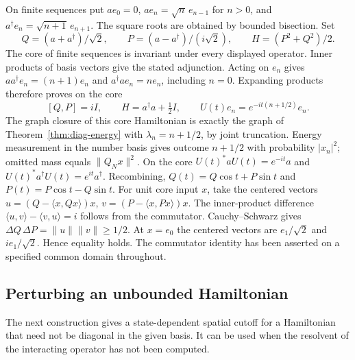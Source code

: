 On finite sequences put $ae_0=0$,
$ae_n=\sqrt n\,e_{n-1}$ for $n>0$, and
$a^\dagger e_n=\sqrt{n+1}\,e_{n+1}$. The square roots are obtained
by bounded bisection. Set
\[
 Q=(a+a^\dagger)/\sqrt2,\qquad
 P=(a-a^\dagger)/(i\sqrt2),\qquad
 H=(P^2+Q^2)/2 .
\]
The core of finite sequences is invariant under every displayed
operator. Inner products of basis vectors give the stated adjunction.
Acting on $e_n$ gives $aa^\dagger e_n=(n+1)e_n$ and
$a^\dagger a e_n=ne_n$, including $n=0$. Expanding products therefore
proves on the core
\[
 [Q,P]=iI,\qquad H=a^\dagger a+\tfrac12 I,\qquad
 U(t)e_n=e^{-it(n+1/2)}e_n .
\]
The graph closure of this core Hamiltonian is exactly the graph of
Theorem~\ref{thm:diag-energy} with $\lambda_n=n+1/2$, by joint
truncation. Energy measurement in the number basis gives outcome $n+1/2$
with probability $|x_n|^2$; omitted mass equals $\|Q_Nx\|^2$.
On the core $U(t)^*aU(t)=e^{-it}a$ and
$U(t)^*a^\dagger U(t)=e^{it}a^\dagger$. Recombining,
$Q(t)=Q\cos t+P\sin t$ and $P(t)=P\cos t-Q\sin t$.
For unit core input $x$, take the centered vectors
$u=(Q-\langle x,Qx\rangle)x$, $v=(P-\langle x,Px\rangle)x$.
The inner-product difference
$\langle u,v\rangle-\langle v,u\rangle=i$ follows from the commutator.
Cauchy--Schwarz gives $\Delta Q\,\Delta P=\|u\|\|v\|\ge1/2$.
At $x=e_0$ the centered vectors are $e_1/\sqrt2$ and $ie_1/\sqrt2$.
Hence equality holds. The commutator identity has been asserted on
a specified common domain throughout.

\subsection{Perturbing an unbounded Hamiltonian}

The next construction gives a state-dependent spatial cutoff for a
Hamiltonian that need not be diagonal in the given basis. It can be used
when the resolvent of the interacting operator has not been computed.

